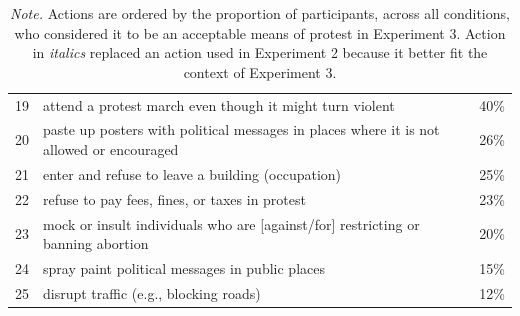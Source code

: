 \documentclass[twocolumn, 11pt, letterpaper]{article}
\begin{document}
\begin{table}
\begin{tabularx}{\linewidth}{rXr}
19 & attend a protest march even though it might turn violent & 40\%\\
20 & paste up posters with political messages in places where it is not allowed or encouraged & 26\%\\
21 & enter and refuse to leave a building (occupation) & 25\%\\
22 & refuse to pay fees, fines, or taxes in protest & 23\%\\
23 & mock or insult individuals who are [against/for] restricting or banning abortion & 20\%\\
24 & spray paint political messages in public places & 15\%\\
25 & disrupt traffic (e.g., blocking roads) & 12\%\\
\bottomrule
\end{tabularx}
\caption*{\textit{Note.} Actions are ordered by the proportion of participants, across all conditions, who considered it to be an acceptable means of protest in Experiment 3. Action in \textit{italics} replaced an action used in Experiment 2 because it better fit the context of Experiment 3.}

\end{table}
\end{document}

